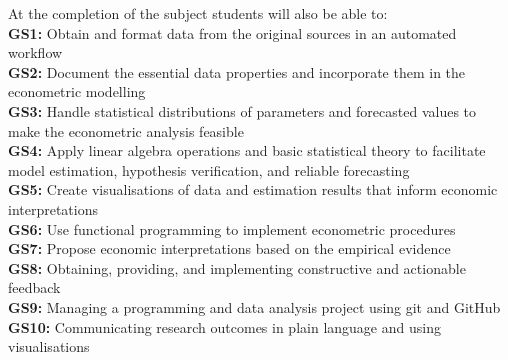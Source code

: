 \documentclass[10pt]{article}
\begin{document}
\begin{multicols}{2}
\noindent\smallskip At the completion of the subject students will also be able to:\\[1ex]
\textbf{GS1:} Obtain and format data from the original sources in an automated workflow\\[1ex]
\textbf{GS2:} Document the essential data properties and incorporate them in the econometric modelling\\[1ex]
\textbf{GS3:} Handle statistical distributions of parameters and forecasted values to make the econometric analysis feasible\\[1ex]
\textbf{GS4:} Apply linear algebra operations and basic statistical theory to facilitate model estimation, hypothesis verification, and reliable forecasting\\[1ex]
\textbf{GS5:} Create visualisations of data and estimation results that inform economic interpretations \\[1ex]
\textbf{GS6:} Use functional programming to implement econometric procedures\\[1ex]
\textbf{GS7:} Propose economic interpretations based on the empirical evidence\\[1ex]
\textbf{GS8:} Obtaining, providing, and implementing constructive and actionable feedback\\[1ex]
\textbf{GS9:} Managing a programming and data analysis project using git and GitHub\\[1ex]
\textbf{GS10:} Communicating research outcomes in plain language and using visualisations

\end{multicols}
\end{document}
